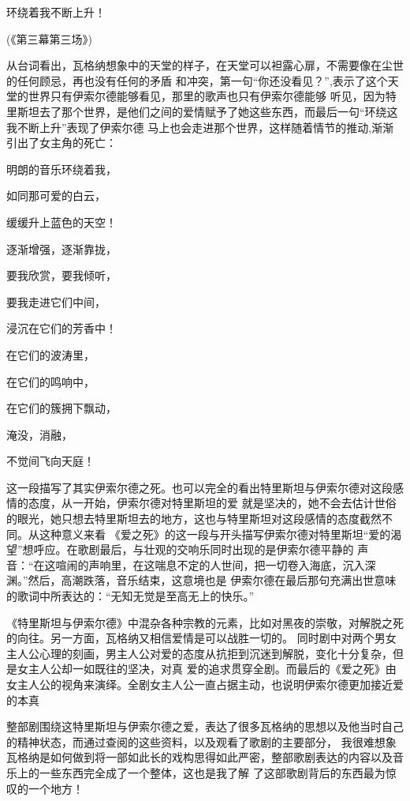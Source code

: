 \documentclass[10pt,a4paper]{ctexart}
\newcommand{\upcite}[1]{\textsuperscript{\textsuperscript{\cite{#1}}}}
\begin{document}
    环绕着我不断上升！\upcite{西洋著名歌剧剧作集1}
                
                    (《第三幕第三场》)
    
    从台词看出，瓦格纳想象中的天堂的样子，在天堂可以袒露心扉，不需要像在尘世的任何顾忌，再也没有任何的矛盾
    和冲突，第一句“你还没看见？”,表示了这个天堂的世界只有伊索尔德能够看见，那里的歌声也只有伊索尔德能够
    听见，因为特里斯坦去了那个世界，是他们之间的爱情赋予了她这些东西，而最后一句“环绕这我不断上升”表现了伊索尔德
    马上也会走进那个世界，这样随着情节的推动,渐渐引出了女主角的死亡：
    
    明朗的音乐环绕着我，

    如同那可爱的白云，

    缓缓升上蓝色的天空！

    逐渐增强，逐渐靠拢，

    要我欣赏，要我倾听，

    要我走进它们中间，

    浸沉在它们的芳香中！

    在它们的波涛里，

    在它们的鸣响中，

    在它们的簇拥下飘动，

    淹没，消融，

    不觉间飞向天庭！\upcite{西洋著名歌剧剧作集2}
    
    这一段描写了其实伊索尔德之死。也可以完全的看出特里斯坦与伊索尔德对这段感情的态度，从一开始，伊索尔德对特里斯坦的爱
    就是坚决的，她不会去估计世俗的眼光，她只想去特里斯坦去的地方，这也与特里斯坦对这段感情的态度截然不同。从这种意义来看
    《爱之死》的这一段与开头描写伊索尔德对特里斯坦“爱的渴望”想呼应。在歌剧最后，与壮观的交响乐同时出现的是伊索尔德平静的
    声音：“在这喧闹的声响里，在这喘息不定的人世间，把一切卷入海底，沉入深渊。”然后，高潮跌落，音乐结束，这意境也是
    伊索尔德在最后那句充满出世意味的歌词中所表达的：“无知无觉是至高无上的快乐。”\upcite{于润洋}

《特里斯坦与伊索尔德》中混杂各种宗教的元素，比如对黑夜的崇敬，对解脱之死的向往。另一方面，瓦格纳又相信爱情是可以战胜一切的。
同时剧中对两个男女主人公心理的刻画，男主人公对爱的态度从抗拒到沉迷到解脱，变化十分复杂，但是女主人公却一如既往的坚决，对真
爱的追求贯穿全剧。而最后的《爱之死》由女主人公的视角来演绎。全剧女主人公一直占据主动，也说明伊索尔德更加接近爱的本真\upcite{王晶}

整部剧围绕这特里斯坦与伊索尔德之爱，表达了很多瓦格纳的思想以及他当时自己的精神状态，而通过查阅的这些资料，以及观看了歌剧的主要部分，
我很难想象瓦格纳是如何做到将一部如此长的戏构思得如此严密，整部歌剧表达的内容以及音乐上的一些东西完全成了一个整体，这也是我了解
了这部歌剧背后的东西最为惊叹的一个地方！
    
    \renewcommand{\refname}{参考文献}
    
\end{document}
